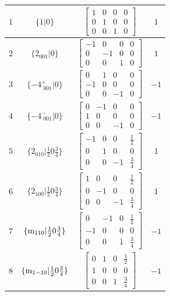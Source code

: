 \documentclass[fleqn,8pt]{jsarticle}
\begin{document}
\begin{longtable}{cccc}
$ 1 $ & $ \{1|0\} $ & $ \begin{bmatrix} 1 & 0 & 0 & 0 \\ 0 & 1 & 0 & 0 \\ 0 & 0 & 1 & 0 \end{bmatrix} $ & $ 1 $ \\ \hline
$ 2 $ & $ \{2{}_{001}|0\} $ & $ \begin{bmatrix} -1 & 0 & 0 & 0 \\ 0 & -1 & 0 & 0 \\ 0 & 0 & 1 & 0 \end{bmatrix} $ & $ 1 $ \\ \hline
$ 3 $ & $ \{-4^{+}_{\,\,001}|0\} $ & $ \begin{bmatrix} 0 & 1 & 0 & 0 \\ -1 & 0 & 0 & 0 \\ 0 & 0 & -1 & 0 \end{bmatrix} $ & $ -1 $ \\ \hline
$ 4 $ & $ \{-4^{-}_{\,\,001}|0\} $ & $ \begin{bmatrix} 0 & -1 & 0 & 0 \\ 1 & 0 & 0 & 0 \\ 0 & 0 & -1 & 0 \end{bmatrix} $ & $ -1 $ \\ \hline
$ 5 $ & $ \{2{}_{010}|\frac{1}{2} 0 \frac{3}{4}\} $ & $ \begin{bmatrix} -1 & 0 & 0 & \frac{1}{2} \\ 0 & 1 & 0 & 0 \\ 0 & 0 & -1 & \frac{3}{4} \end{bmatrix} $ & $ 1 $ \\ \hline
$ 6 $ & $ \{2{}_{100}|\frac{1}{2} 0 \frac{3}{4}\} $ & $ \begin{bmatrix} 1 & 0 & 0 & \frac{1}{2} \\ 0 & -1 & 0 & 0 \\ 0 & 0 & -1 & \frac{3}{4} \end{bmatrix} $ & $ 1 $ \\ \hline
$ 7 $ & $ \{{\rm m}_{110}|\frac{1}{2} 0 \frac{3}{4}\} $ & $ \begin{bmatrix} 0 & -1 & 0 & \frac{1}{2} \\ -1 & 0 & 0 & 0 \\ 0 & 0 & 1 & \frac{3}{4} \end{bmatrix} $ & $ -1 $ \\ \hline
$ 8 $ & $ \{{\rm m}_{1-10}|\frac{1}{2} 0 \frac{3}{4}\} $ & $ \begin{bmatrix} 0 & 1 & 0 & \frac{1}{2} \\ 1 & 0 & 0 & 0 \\ 0 & 0 & 1 & \frac{3}{4} \end{bmatrix} $ & $ -1 $ \\
\end{longtable}
\end{document}
